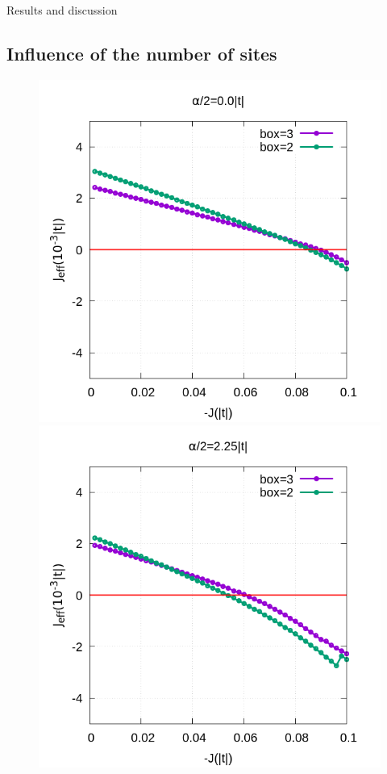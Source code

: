 \documentclass[12pt,twoside]{report}
\begin{document}
\begin{chapter}{Results and discussion}
	\subsection{Influence of the number of sites}
	\begin{figure}[h!]
		\centering
		\hspace{-2cm}
		\begin{minipage}{0.4\textwidth}
			\includegraphics[scale=0.35]{Jeff_vs_J_sites_3-xrep-0.png}
		\end{minipage}
		\hspace{2cm}
		\begin{minipage}{0.4\textwidth}
			\includegraphics[scale=0.35]{Jeff_vs_J_sites_3-xrep-225.png}

\end{minipage}
\end{figure}
\end{chapter}
\end{document}
